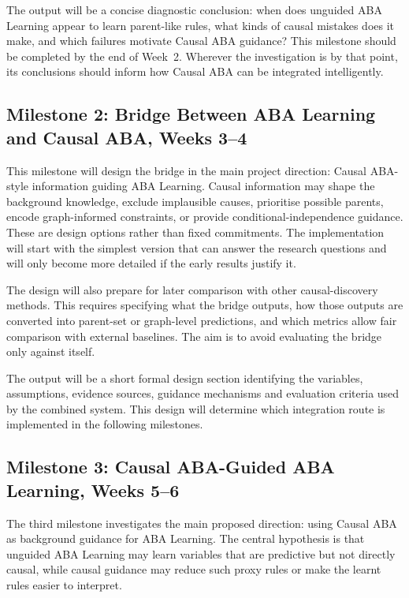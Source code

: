 The output will be a concise diagnostic conclusion: when does unguided ABA Learning appear to learn parent-like rules, what kinds of causal mistakes does it make, and which failures motivate Causal ABA guidance? This milestone should be completed by the end of Week~2. Wherever the investigation is by that point, its conclusions should inform how Causal ABA can be integrated intelligently.

\subsection{Milestone 2: Bridge Between ABA Learning and Causal ABA, Weeks 3--4}
\label{subsec:milestone-bridge}

This milestone will design the bridge in the main project direction: Causal ABA-style information guiding ABA Learning. Causal information may shape the background knowledge, exclude implausible causes, prioritise possible parents, encode graph-informed constraints, or provide conditional-independence guidance. These are design options rather than fixed commitments. The implementation will start with the simplest version that can answer the research questions and will only become more detailed if the early results justify it.

The design will also prepare for later comparison with other causal-discovery methods. This requires specifying what the bridge outputs, how those outputs are converted into parent-set or graph-level predictions, and which metrics allow fair comparison with external baselines. The aim is to avoid evaluating the bridge only against itself.

The output will be a short formal design section identifying the variables, assumptions, evidence sources, guidance mechanisms and evaluation criteria used by the combined system. This design will determine which integration route is implemented in the following milestones.

\subsection{Milestone 3: Causal ABA-Guided ABA Learning, Weeks 5--6}
\label{subsec:milestone-guided-learning}

The third milestone investigates the main proposed direction: using Causal ABA as background guidance for ABA Learning. The central hypothesis is that unguided ABA Learning may learn variables that are predictive but not directly causal, while causal guidance may reduce such proxy rules or make the learnt rules easier to interpret.

